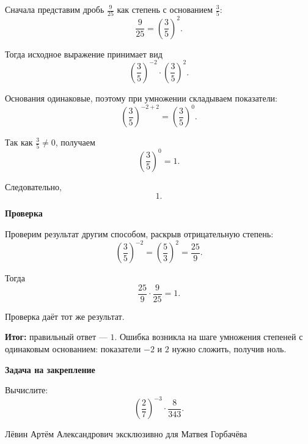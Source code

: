 \documentclass[12pt,a4paper]{article}
\begin{document}
Сначала представим дробь $\frac{9}{25}$ как степень с основанием $\frac{3}{5}$:
\[
\frac{9}{25}=\left(\frac{3}{5}\right)^2.
\]

Тогда исходное выражение принимает вид
\[
\left(\frac{3}{5}\right)^{-2}\cdot\left(\frac{3}{5}\right)^2.
\]

Основания одинаковые, поэтому при умножении складываем показатели:
\[
\left(\frac{3}{5}\right)^{-2+2}
=
\left(\frac{3}{5}\right)^0.
\]

Так как $\frac{3}{5}\ne 0$, получаем
\[
\left(\frac{3}{5}\right)^0=1.
\]

Следовательно,
\[
\boxed{1}.
\]

\textbf{Проверка}

Проверим результат другим способом, раскрыв отрицательную степень:
\[
\left(\frac{3}{5}\right)^{-2}
=
\left(\frac{5}{3}\right)^2
=
\frac{25}{9}.
\]

Тогда
\[
\frac{25}{9}\cdot\frac{9}{25}=1.
\]

Проверка даёт тот же результат.

\textcolor{teal!60!black}{\textbf{Итог:}} правильный ответ --- $1$. Ошибка возникла на шаге умножения степеней с одинаковым основанием: показатели $-2$ и $2$ нужно сложить, получив ноль.

\textbf{Задача на закрепление}

Вычислите:
\[
\left(\frac{2}{7}\right)^{-3}\cdot\frac{8}{343}.
\]

\vfill
\begin{center}
\small Лёвин Артём Александрович эксклюзивно для Матвея Горбачёва
\end{center}

\end{document}

